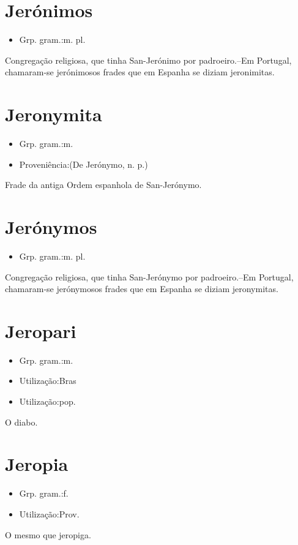 \documentclass{article}
\begin{document}
\section{Jerónimos}
\begin{itemize}
\item {Grp. gram.:m. pl.}
\end{itemize}
Congregação religiosa, que tinha San-Jerónimo por padroeiro.--Em Portugal, chamaram-se \textunderscore jerónimos\textunderscore  os frades que em Espanha se diziam \textunderscore jeronimitas\textunderscore .
\section{Jeronymita}
\begin{itemize}
\item {Grp. gram.:m.}
\end{itemize}
\begin{itemize}
\item {Proveniência:(De \textunderscore Jerónymo\textunderscore , n. p.)}
\end{itemize}
Frade da antiga Ordem espanhola de San-Jerónymo.
\section{Jerónymos}
\begin{itemize}
\item {Grp. gram.:m. pl.}
\end{itemize}
Congregação religiosa, que tinha San-Jerónymo por padroeiro.--Em Portugal, chamaram-se \textunderscore jerónymos\textunderscore  os frades que em Espanha se diziam \textunderscore jeronymitas\textunderscore .
\section{Jeropari}
\begin{itemize}
\item {Grp. gram.:m.}
\end{itemize}
\begin{itemize}
\item {Utilização:Bras}
\end{itemize}
\begin{itemize}
\item {Utilização:pop.}
\end{itemize}
O diabo.
\section{Jeropia}
\begin{itemize}
\item {Grp. gram.:f.}
\end{itemize}
\begin{itemize}
\item {Utilização:Prov.}
\end{itemize}
O mesmo que \textunderscore jeropiga\textunderscore .
\end{document}
